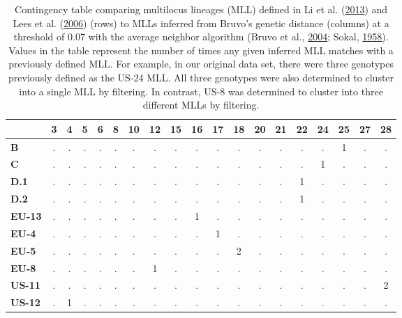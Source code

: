 \documentclass[double,12pt]{beavtex}
\begin{document}
  \begin{table}
  \centering
  \caption[Contingency table comparing multilocus lineages (MLL)]{Contingency table comparing multilocus lineages (MLL) defined in Li et
  al. (\protect\hyperlink{ref-li2013efficient}{2013}) and Lees et al.
  (\protect\hyperlink{ref-lees2006novel}{2006}) (rows) to MLLs inferred
  from Bruvo's genetic distance (columns) at a threshold of 0.07 with the
  average neighbor algorithm (Bruvo et al.,
  \protect\hyperlink{ref-bruvo2004simple}{2004}; Sokal,
  \protect\hyperlink{ref-sokal1958statistical}{1958}). Values in the table
  represent the number of times any given inferred MLL matches with a
  previously defined MLL. For example, in our original data set, there
  were three genotypes previously defined as the US-24 MLL. All three
  genotypes were also determined to cluster into a single MLL by
  filtering. In contrast, US-8 was determined to cluster into three
  different MLLs by filtering.} 
  \label{tab:pinftable}
  \begin{tabular}{l|cccccccccccccccccc}
    & \textbf{3} & \textbf{4} & \textbf{5} & \textbf{6} & \textbf{8} & \textbf{10} & \textbf{12} & \textbf{15} & \textbf{16} & \textbf{17} & \textbf{18} & \textbf{20} & \textbf{21} & \textbf{22} & \textbf{24} & \textbf{25} & \textbf{27} & \textbf{28} \\ 
    \midrule
  \textbf{B} & . & . & . & . & . & . & . & . & . & . & . & . & . & . & . & 1 & . & . \\ 
    \textbf{C} & . & . & . & . & . & . & . & . & . & . & . & . & . & . & 1 & . & . & . \\ 
    \textbf{D.1} & . & . & . & . & . & . & . & . & . & . & . & . & . & 1 & . & . & . & . \\ 
    \textbf{D.2} & . & . & . & . & . & . & . & . & . & . & . & . & . & 1 & . & . & . & . \\ 
    \textbf{EU-13} & . & . & . & . & . & . & . & . & 1 & . & . & . & . & . & . & . & . & . \\ 
    \textbf{EU-4} & . & . & . & . & . & . & . & . & . & 1 & . & . & . & . & . & . & . & . \\ 
    \textbf{EU-5} & . & . & . & . & . & . & . & . & . & . & 2 & . & . & . & . & . & . & . \\ 
    \textbf{EU-8} & . & . & . & . & . & . & 1 & . & . & . & . & . & . & . & . & . & . & . \\ 
    \textbf{US-11} & . & . & . & . & . & . & . & . & . & . & . & . & . & . & . & . & . & 2 \\ 
    \textbf{US-12} & . & 1 & . & . & . & . & . & . & . & . & . & . & . & . & . & . & . & . \\ 

\end{tabular}
\end{table}
\end{document}
